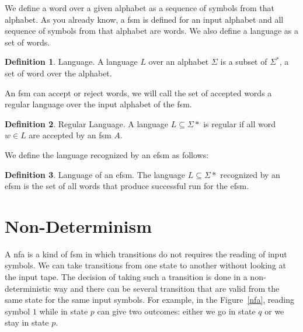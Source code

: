 \documentclass[12pt]{article}
\theoremstyle{definition}
\newtheorem{definition}{Definition}[section]
\theoremstyle{definition}
\theoremstyle{remark}
\begin{document}

We define a word over a given alphabet as a sequence of symbols from that alphabet. As you already know, a \gls{fsm} is defined for an input alphabet and all sequence of symbols from that alphabet are words. We also define a language as a set of words.

\theoremstyle{definition}
\begin{definition}{Language.} A language $L$ over an alphabet $\Sigma$ is a subset of $\Sigma^*$, a set of word over the alphabet.
\end{definition}

An \gls{fsm} can accept or reject words, we will call the set of accepted words a regular language over the input alphabet of the \gls{fsm}.

\theoremstyle{definition}
\begin{definition}{Regular Language.} A language $L \subseteq \Sigma*$ is regular if all word $w \in L$ are accepted by an \gls{fsm} $A$.~\cite{Yu:1997:RL:267846.267848}
\end{definition}

We define the language recognized by an \gls{efsm} as follows:
\theoremstyle{definition}
\begin{definition}{Language of an \gls{efsm}.} The language $L \subseteq \Sigma*$ recognized by an \gls{efsm} is the set of all words that produce successful run for the \gls{efsm}.
\end{definition}



\section{Non-Determinism}


A \gls{nfa} is a kind of \gls{fsm} in which transitions do not requires the reading of input symbols. We can take transitions from one state to another without looking at the input tape. The decision of taking such a transition is done in a non-deterministic way and there can be several transition that are valid from the same state for the same input symbols. For example, in the Figure~\ref{nfa}, reading symbol $1$ while in state $p$ can give two outcomes: either we go in state $q$ or we stay in state $p$.~\cite{FA-DecisionProblems:1959}
\end{document}
